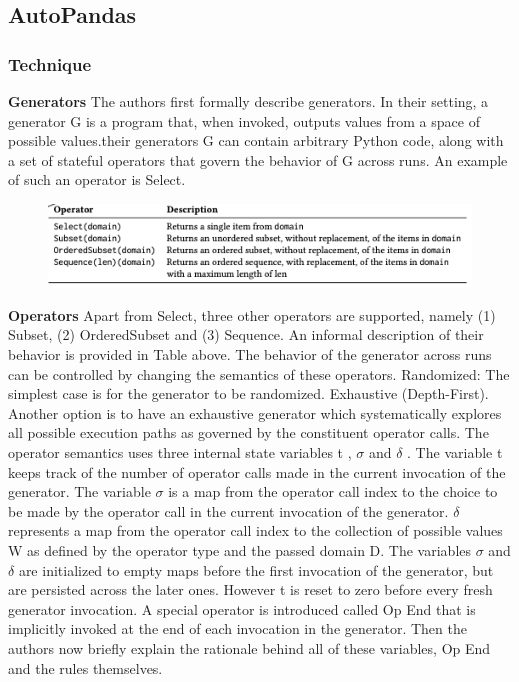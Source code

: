 \documentclass{article}
\begin{document}
\subsection{AutoPandas}
\subsubsection{Technique}
\textbf{Generators} The authors first formally describe generators. In their setting, a generator G is a program that, when invoked, outputs values from a space of possible values.their generators G can contain arbitrary Python code, along with a set of stateful operators that govern the behavior of G across runs. An example of such an operator is Select.
\begin{figure}[ht]
\vskip 0.2in
\begin{center}
\centerline{\includegraphics[width=\columnwidth]{Images/Synthesis3-1.png}}
\label{icml-historical}
\end{center}
\vskip -0.2in
\end{figure}
\textbf{Operators} Apart from Select, three other operators are supported, namely (1) Subset, (2) OrderedSubset and (3) Sequence. An informal description of their behavior is provided in Table above. The behavior of the generator across runs can be controlled by changing the semantics of these operators. 
Randomized: The simplest case is for the generator to be randomized.
Exhaustive (Depth-First). Another option is to have an exhaustive generator which systematically explores all possible execution paths as governed by the constituent operator calls. 
The operator semantics uses three internal state variables t , $\sigma$ and $\delta$ . The variable t keeps track of the number of operator calls made in the current invocation of the generator. The variable $\sigma$ is a map from the operator call index to the choice to be made by the operator call in the current invocation of the generator. $\delta$ represents a map from the operator call index to the collection of possible values W as defined by the operator type and the passed domain D. The variables $\sigma$ and $\delta$ are initialized to empty maps before the first invocation of the generator, but are persisted across the later ones. However t is reset to zero before every fresh generator invocation. A special operator is introduced called Op End that is implicitly invoked at the end of each invocation in the generator. Then the authors now briefly explain the rationale behind all of these variables, Op End and the rules themselves.
\end{document}
